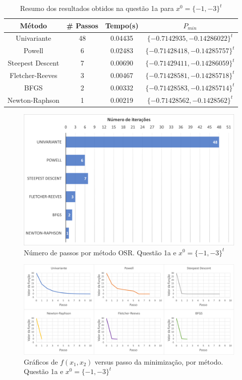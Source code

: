 \documentclass[10pt, a4paper]{article}
\begin{document}
\begin{table}[H]
  \begin{center}
    \begin{tabular}{c|c|c|c}
      \textbf{Método} & \textbf{\# Passos} & \textbf{Tempo(s)} & \textbf{$P_{min}$}\\
      \hline
      Univariante & 48 & 0.04435 & $\{-0.7142935, -0.14286022\}^t$\\
      Powell & 6 & 0.02483 & $\{-0.71428418, -0.14285757\}^t$\\
      Steepest Descent & 7 & 0.00690 & $\{-0.71429411, -0.14286059\}^t$\\
      Fletcher-Reeves & 3 & 0.00467 & $\{-0.71428581, -0.14285718\}^t$\\
      BFGS & 2 & 0.00332 & $\{-0.71428583, -0.14285714\}^t$\\
      Newton-Raphson & 1 & 0.00219 & $\{-0.71428562, -0.1428562\}^t$\\
    \end{tabular}
  \end{center}
  \caption{Resumo dos resultados obtidos na questão 1a para $x^0 = \{-1,-3\}^t$}
\end{table}

\begin{figure}[H]
  \centering
  \includegraphics[scale=0.4]{figuras/q1a_passos_P2.PNG}
  \caption{Número de passos por método OSR. Questão 1a e $x^0 = \{-1,-3\}^t$ }
\end{figure}

\begin{figure}[H]
  \centering
  \includegraphics[scale=0.45]{figuras/q1a_fxpassos_P2.PNG}
  \caption{Gráficos de $f(x_1,x_2)$ versus passo da minimização, por método. Questão 1a e $x^0 = \{-1,-3\}^t$}
\end{figure}
\end{document}
